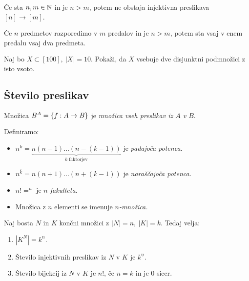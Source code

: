 \begin{trditev}
    Če sta $n, m \in \mathbb{N}$ in je $n > m$, potem ne obstaja injektivna preslikava $[n] \to [m]$.
\end{trditev}

\begin{opomba}
    Če $n$ predmetov razporedimo v $m$ predalov in je $n > m$, potem sta vsaj v enem predalu vsaj dva predmeta.
\end{opomba}

\begin{primer}
    Naj bo $X \subset [100], \ |X|=10$. Pokaži, da $X$ vsebuje dve disjunktni podmnožici z isto vsoto.
\end{primer}

\subsection{Število preslikav}
\begin{definicija}
    Množica $B^A = \left\{f: A \to B\right\}$ je \emph{množica vseh preslikav iz $A$ v $B$}.
\end{definicija}

\begin{definicija} Definiramo:
    \begin{itemize}
        \item $n^{\underline{k}} = \underbrace{n(n-1) \ldots (n-(k-1))}_\text{$k$ faktorjev}$ je \emph{padajoča potenca.}
        \item $n^{\overline{k}} = n(n+1) \ldots (n+(k-1))$ je \emph{naraščajoča potenca.}
        \item $n! = ^{\underline{n}}$ je \emph{$n$ fakulteta}.
        \item Množica z $n$ elementi se imenuje \emph{$n$-množica.}
    \end{itemize}
\end{definicija}

\begin{trditev}
    Naj bosta $N$ in $K$ končni množici z $|N| = n, \ |K| = k$. Tedaj velja:
    \begin{enumerate}
        \item $|K^N| = k^n$.
        \item Število injektivnih preslikav iz $N$ v $K$ je $k^{\underline{n}}$.
        \item Število bijekcij iz $N$ v $K$ je $n!$, če $n = k$ in je $0$ sicer.
    \end{enumerate} 
\end{trditev}

